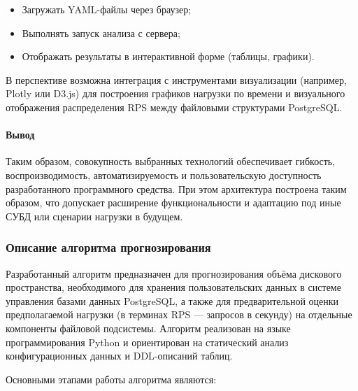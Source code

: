 \begin{itemize}
  \item Загружать YAML-файлы через браузер;
  \item Выполнять запуск анализа с сервера;
  \item Отображать результаты в интерактивной форме (таблицы, графики).
\end{itemize}

В перспективе возможна интеграция с инструментами визуализации (например, Plotly или D3.js) для построения графиков нагрузки по времени и визуального отображения распределения RPS между файловыми структурами PostgreSQL.

\paragraph{Вывод}

Таким образом, совокупность выбранных технологий обеспечивает гибкость, воспроизводимость, автоматизируемость и пользовательскую доступность разработанного программного средства. При этом архитектура построена таким образом, что допускает расширение функциональности и адаптацию под иные СУБД или сценарии нагрузки в будущем.




\subsubsection{Описание алгоритма прогнозирования}

Разработанный алгоритм предназначен для прогнозирования объёма дискового пространства, необходимого для хранения пользовательских данных в системе управления базами данных PostgreSQL, а также для предварительной оценки предполагаемой нагрузки (в терминах RPS --- запросов в секунду) на отдельные компоненты файловой подсистемы. Алгоритм реализован на языке программирования Python и ориентирован на статический анализ конфигурационных данных и DDL-описаний таблиц.

\vspace{0.5em}
\noindent
Основными этапами работы алгоритма являются:

